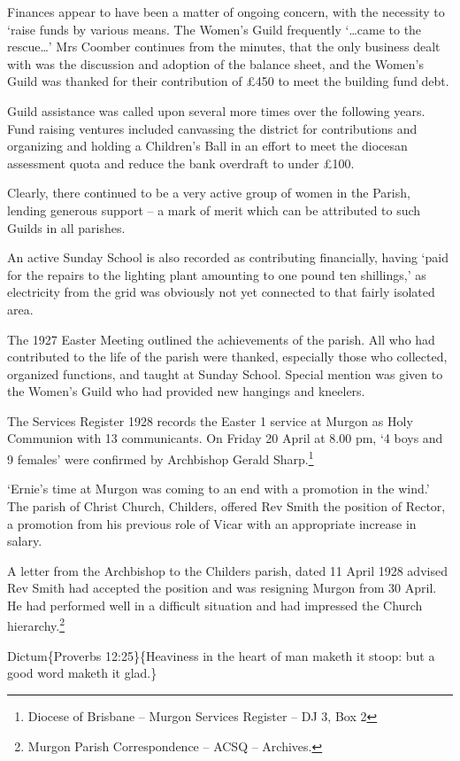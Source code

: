Finances appear to have been a matter of ongoing concern, with the necessity to `raise funds by various means. The Women's Guild frequently `\ldots came to the rescue\ldots' Mrs Coomber continues from the minutes, that the only business dealt with was the discussion and adoption of the balance sheet, and the Women's Guild was thanked for their contribution of £450 to meet the building fund debt.

Guild assistance was called upon several more times over the following years. Fund raising ventures included canvassing the district for contributions and organizing and holding a Children's Ball in an effort to meet the diocesan assessment quota and reduce the bank overdraft to under £100.

Clearly, there continued to be a very active group of women in the Parish, lending generous support -- a mark of merit which can be attributed to such Guilds in all parishes.

An active Sunday School is also recorded as contributing financially, having `paid for the repairs to the lighting plant amounting to one pound ten shillings,' as electricity from the grid was obviously not yet connected to that fairly isolated area.

The 1927 Easter Meeting outlined the achievements of the parish. All who had contributed to the life of the parish were thanked, especially those who collected, organized functions, and taught at Sunday School. Special mention was given to the Women's Guild who had provided new hangings and kneelers.

The Services Register 1928 records the Easter 1 service at Murgon as Holy Communion with 13 communicants. On Friday 20 April at 8.00 pm, `4 boys and 9 females' were confirmed by Archbishop Gerald Sharp.\footnote{Diocese of Brisbane -- Murgon Services Register -- DJ 3, Box 2}

`Ernie's time at Murgon was coming to an end with a promotion in the wind.' The parish of Christ Church, Childers, offered Rev Smith the position of Rector, a promotion from his previous role of Vicar with an appropriate increase in salary.

A letter from the Archbishop to the Childers parish, dated 11 April 1928 advised Rev Smith had accepted the position and was resigning Murgon from 30 April. He had performed well in a difficult situation and had impressed the Church hierarchy.\footnote{Murgon Parish Correspondence -- ACSQ -- Archives.}

Dictum\{Proverbs 12:25\}\{Heaviness in the heart of man maketh it stoop: but a good word maketh it glad.\}

